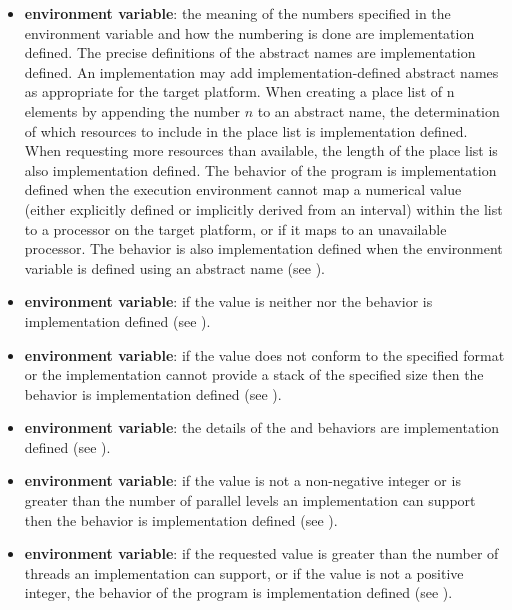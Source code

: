 \begin{itemize}
\item {} \textbf{environment variable}: the meaning of the numbers specified in the
environment variable and how the numbering is done are implementation defined.
The precise definitions of the abstract names are implementation defined. An
implementation may add implementation-defined abstract names as appropriate for
the target platform. When creating a place list of n elements by appending the
number $n$ to an abstract name, the determination of which resources to include in the
place list is implementation defined. When requesting more resources than available,
the length of the place list is also implementation defined. The behavior of the
program is implementation defined when the execution environment cannot map a
numerical value (either explicitly defined or implicitly derived from an interval)
within the  list to a processor on the target platform, or if it maps to an
unavailable processor. The behavior is also implementation defined when the
 environment variable is defined using an abstract name (see ).

\item {} \textbf{environment variable}: if the value is neither
 nor  the behavior is implementation defined (see
).

\item {} \textbf{environment variable}: if the value does not conform to the
specified format or the implementation cannot provide a stack of the specified size
then the behavior is implementation defined (see ).

\item {} \textbf{environment variable}: the details of the  and
 behaviors are implementation defined (see ).

\item {} \textbf{environment variable}: if the value is not a
non-negative integer or is greater than the number of parallel levels an implementation
can support then the behavior is implementation defined (see ).

\item {} \textbf{environment variable}: if the requested value is greater than
the number of threads an implementation can support, or if the value is not a positive
integer, the behavior of the program is implementation defined (see ).


\end{itemize}
